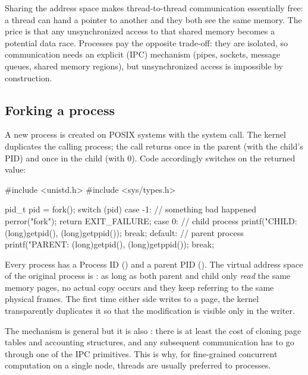 \begin{observationblock}
Sharing the address space makes thread-to-thread communication essentially free: a thread can hand a pointer to another and they both see the same memory. The price is that any unsynchronized access to that shared memory becomes a potential data race. Processes pay the opposite trade-off: they are isolated, so communication needs an explicit  (IPC) mechanism (pipes, sockets, message queues, shared memory regions), but unsynchronized access is impossible by construction.
\end{observationblock}

\subsection{Forking a process}

A new process is created on POSIX systems with the  system call. The kernel duplicates the calling process; the call returns once in the parent (with the child's PID) and once in the child (with $0$). Code accordingly switches on the returned value:

\begin{codeblock}[language=C]
#include <unistd.h>
#include <sys/types.h>

pid_t pid = fork();
switch (pid) {
case -1:                  // something bad happened
    perror("fork");
    return EXIT_FAILURE;
case 0:                   // child process
    printf("CHILD\n\tPID: %
           (long)getpid(), (long)getppid());
    break;
default:                  // parent process
    printf("PARENT\n\tPID: %
           (long)getpid(), (long)getppid());
    break;
}
\end{codeblock}

Every process has a Process ID () and a parent PID (). The virtual address space of the original process is : as long as both parent and child only \emph{read} the same memory pages, no actual copy occurs and they keep referring to the same physical frames. The first time either side writes to a page, the kernel transparently duplicates it so that the modification is visible only in the writer.

The mechanism is general but it is also : there is at least the cost of cloning page tables and accounting structures, and any subsequent communication has to go through one of the IPC primitives. This is why, for fine-grained concurrent computation on a single node, threads are usually preferred to processes.

